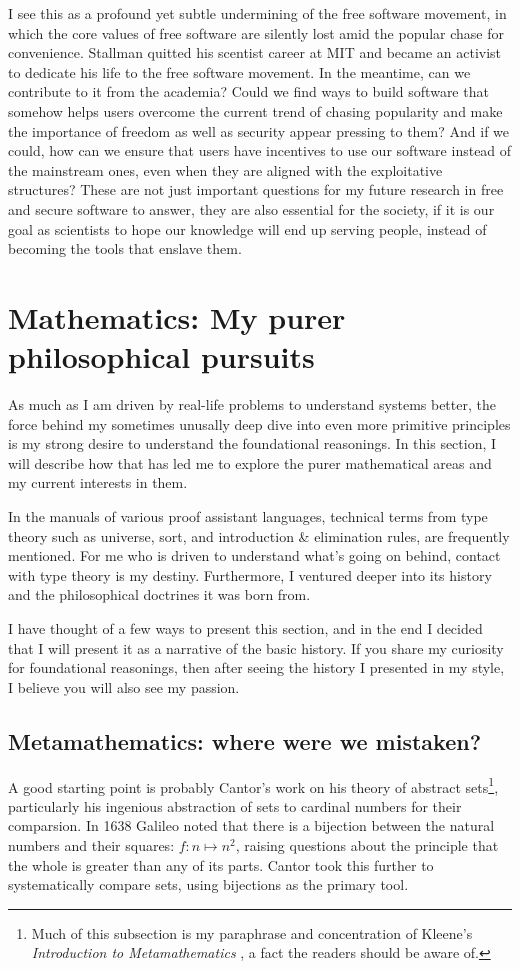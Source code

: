 \documentclass[10pt]{article}
\begin{document}
I see this as a profound yet subtle undermining of the free software movement,
in which the core values of free software are silently lost amid the popular
chase for convenience. Stallman quitted his scentist career at MIT and became
an activist to dedicate his life to the free software movement. In the
meantime, can we contribute to it from the academia? Could we find ways to
build software that somehow helps users overcome the current trend of chasing
popularity and make the importance of freedom as well as security appear
pressing to them? And if we could, how can we ensure that users have incentives
to use our software instead of the mainstream ones, even when they are aligned
with the exploitative structures? These are not just important questions for
my future research in free and secure software to answer, they are also
essential for the society, if it is our goal as scientists to hope our
knowledge will end up serving people, instead of becoming the tools that
enslave them.

\section[Mathematics]{Mathematics: My purer philosophical pursuits}
\label{sec.math}
As much as I am driven by real-life problems to understand systems better, the
force behind my sometimes unusally deep dive into even more primitive
principles is my strong desire to understand the foundational reasonings. In
this section, I will describe how that has led me to explore the purer
mathematical areas and my current interests in them.

In the manuals of various proof assistant languages, technical terms from type
theory such as universe, sort, and introduction \& elimination rules, are
frequently mentioned. For me who is driven to understand what's going on
behind, contact with type theory is my destiny. Furthermore, I ventured deeper
into its history and the philosophical doctrines it was born from.

I have thought of a few ways to present this section, and in the end I decided
that I will present it as a narrative of the basic history. If you share my
curiosity for foundational reasonings, then after seeing the history I
presented in my style, I believe you will also see my passion.

\subsection[Metamathematics]{Metamathematics: where were we mistaken?}
\label{sec.metamath}
A good starting point is probably Cantor's work on his theory of abstract
sets\footnote{Much of this subsection is my paraphrase and concentration of
	Kleene's \emph{Introduction to Metamathematics} \cite{kleeneitmm}, a fact
the readers should be aware of.},
particularly his ingenious abstraction of sets to cardinal numbers for their
comparsion.  In 1638 Galileo noted that there is a bijection between the
natural numbers and their squares: $f : n \mapsto n^2$, raising questions about
the principle that the whole is greater than any of its parts. Cantor took this
further to systematically compare sets, using bijections as the primary tool. 
\end{document}
